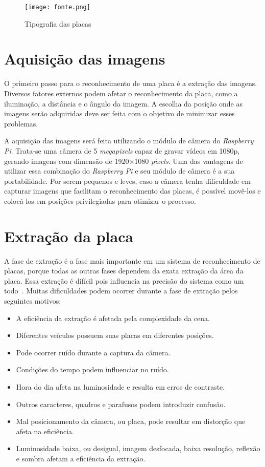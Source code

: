 \begin{figure}[H]
	\centering
	\texttt{[image: fonte.png]}
	\caption{Tipografia das placas}
	\label{fig:tipografia}
\end{figure}

\section{Aquisição das imagens}
\label{sec:aquisicao}

O primeiro passo para o reconhecimento de uma placa é a extração das imagens. Diversos fatores externos podem afetar o reconhecimento da placa, como a iluminação, a distância e o ângulo da imagem. A escolha da posição onde as imagens serão adquiridas deve ser feita com o objetivo de minimizar esses problemas.

A aquisição das imagens será feita utilizando o módulo de câmera do
\emph{Raspberry Pi}. Trata-se uma câmera de 5 \emph{megapixels} capaz de gravar vídeos em 1080p, gerando imagens com dimensão de 1920×1080 \emph{pixels}. Uma das vantagens de utilizar essa combinação do \emph{Raspberry Pi} e seu módulo de câmera é a sua portabilidade. Por serem pequenos e leves, caso a câmera tenha dificuldade em capturar imagens que facilitam o reconhecimento das placas, é possível movê-los e colocá-los em posições privilegiadas para otimizar o processo.

\section{Extração da placa}
\label{sec:extracao}

A fase de extração é a fase mais importante em um sistema de reconhecimento de placas, porque todas as outras fases dependem da exata extração da área da placa. Essa extração é difícil pois influencia na precisão do sistema como um todo~\cite{kaur2014efficient}. Muitas dificuldades podem ocorrer durante a fase de extração pelos seguintes motivos:

\begin{itemize}
	\item A eficiência da extração é afetada pela complexidade da cena.
	\item Diferentes veículos possuem suas placas em diferentes posições.
	\item Pode ocorrer ruído durante a captura da câmera.
	\item Condições do tempo podem influenciar no ruído.
	\item Hora do dia afeta na luminosidade e resulta em erros de contraste.
	\item Outros caracteres, quadros e parafusos podem introduzir confusão.
	\item Mal posicionamento da câmera, ou placa, pode resultar em distorção que afeta na eficiência.
	\item Luminosidade baixa, ou desigual, imagem desfocada, baixa resolução, reflexão e sombra afetam a eficiência da extração.
\end{itemize}

